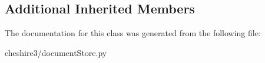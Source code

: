 \subsection*{Additional Inherited Members}


The documentation for this class was generated from the following file\-:\begin{DoxyCompactItemize}
\item 
cheshire3/document\-Store.\-py\end{DoxyCompactItemize}
